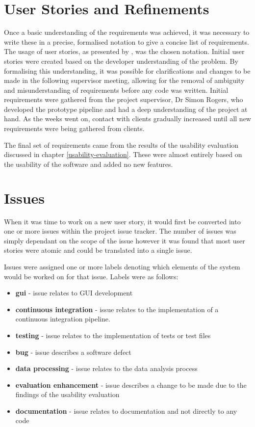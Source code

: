 \documentclass{l4proj}
\begin{document}
\section{User Stories and Refinements} \label{user-stories-and-refinements}
Once a basic understanding of the requirements was achieved, it was necessary to write these in a precise, formalised notation to give a concise list of requirements. The usage of user stories, as presented by \cite{user-stories}, was the chosen notation. Initial user stories were created based on the developer understanding of the problem. By formalising this understanding, it was possible for clarifications and changes to be made in the following supervisor meeting, allowing for the removal of ambiguity and misunderstanding of requirements before any code was written. Initial requirements were gathered from the project supervisor, Dr Simon Rogers, who developed the prototype pipeline and had a deep understanding of the project at hand. As the weeks went on, contact with clients gradually increased until all new requirements were being gathered from clients.

The final set of requirements came from the results of the usability evaluation discussed in chapter \ref{usability-evaluation}. These were almost entirely based on the usability of the software and added no new features.

\section{Issues}
When it was time to work on a new user story, it would first be converted into one or more issues within the project issue tracker. The number of issues was simply dependant on the scope of the issue however it was found that most user stories were atomic and could be translated into a single issue.

Issues were assigned one or more labels denoting which elements of the system would be worked on for that issue. Labels were as follows: 
\begin{itemize}
    \item \textbf{gui} - issue relates to GUI development
    \item \textbf{continuous integration} - issue relates to the implementation of a continuous integration pipeline.
    \item \textbf{testing} - issue relates to the implementation of tests or test files
    \item \textbf{bug} - issue describes a software defect
    \item \textbf{data processing} - issue relates to the data analysis process
    \item \textbf{evaluation enhancement} - issue describes a change to be made due to the findings of the usability evaluation
    \item \textbf{documentation} - issue relates to documentation and not directly to any code
\end{itemize}
\end{document}
